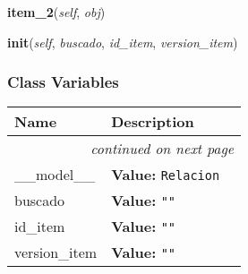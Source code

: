     \vspace{0.5ex}

\hspace{.8\funcindent}\begin{boxedminipage}{\funcwidth}

    \raggedright \textbf{item\_2}(\textit{self}, \textit{obj})

\setlength{\parskip}{2ex}
\setlength{\parskip}{1ex}
    \end{boxedminipage}

    \label{saip:controllers:relacion_controller_listado:RelacionTableFiller:init}

    \vspace{0.5ex}

\hspace{.8\funcindent}\begin{boxedminipage}{\funcwidth}

    \raggedright \textbf{init}(\textit{self}, \textit{buscado}, \textit{id\_item}, \textit{version\_item})

\setlength{\parskip}{2ex}
\setlength{\parskip}{1ex}
    \end{boxedminipage}



  \subsubsection{Class Variables}

    \vspace{-1cm}
\hspace{\varindent}\begin{longtable}{|p{\varnamewidth}|p{\vardescrwidth}|l}
\cline{1-2}
\cline{1-2} \centering \textbf{Name} & \centering \textbf{Description}& \\
\cline{1-2}
\endhead\cline{1-2}\multicolumn{3}{r}{\small\textit{continued on next page}}\\\endfoot\cline{1-2}
\endlastfoot\raggedright \_\-\_\-m\-o\-d\-e\-l\-\_\-\_\- & \raggedright \textbf{Value:} 
{\tt Relacion}&\\
\cline{1-2}
\raggedright b\-u\-s\-c\-a\-d\-o\- & \raggedright \textbf{Value:} 
{\tt ""}&\\
\cline{1-2}
\raggedright i\-d\-\_\-i\-t\-e\-m\- & \raggedright \textbf{Value:} 
{\tt ""}&\\
\cline{1-2}
\raggedright v\-e\-r\-s\-i\-o\-n\-\_\-i\-t\-e\-m\- & \raggedright \textbf{Value:} 
{\tt ""}&\\
\cline{1-2}
\end{longtable}

